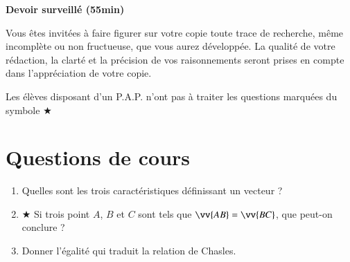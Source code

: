 \documentclass[oneside,12pt]{exam}          %
\begin{document}
\footer{}{\footnotesize \etablissement}{}

\hrulefill\raisebox{-1.9pt}{\quad\decofourleft~\decosix~\decofourright \quad}\hrulefill

\begin{center}
	\textbf{\large Devoir surveillé  (55min)}
\end{center}
\vspace{-5pt}
Vous êtes invité\textperiodcentered e\textperiodcentered s à faire figurer sur votre copie toute trace de recherche, même incomplète ou non fructueuse, que vous aurez développée. La qualité de votre rédaction, la clarté et la précision de vos raisonnements seront prises en compte dans l'appréciation de votre copie.

Les élèves disposant d'un P.A.P. n'ont pas à traiter les questions marquées du symbole $\bigstar$

\vspace{-8pt}\hrulefill\raisebox{-1.9pt}{\quad\decofourleft~\decosix~\decofourright \quad}\hrulefill
\vspace{5pt}



\section{Questions de cours}
\begin{enumerate}[itemsep = 2mm]
	\item Quelles sont les trois caractéristiques définissant un vecteur ?
	
	\dotfill
	\item $\bigstar$ Si trois point $A$, $B$ et $C$ sont tels que $\vv{AB} = \vv{BC}$, que peut-on conclure ?
	
	\dotfill
	\item Donner l'égalité qui traduit la relation de Chasles.
	
	\makebox[8cm]{\dotfill}
\end{enumerate}
\end{document}
